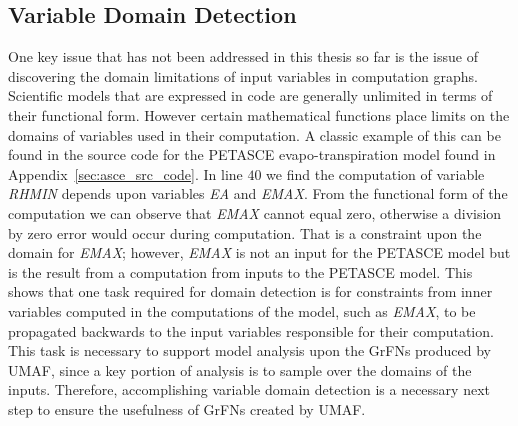 \subsection{Variable Domain Detection\label{sec:var_domain_detection}}
One key issue that has not been addressed in this thesis so far is the issue of discovering the domain limitations of input variables in computation graphs.
Scientific models that are expressed in code are generally unlimited in terms of their functional form.
However certain mathematical functions place limits on the domains of variables used in their computation.
A classic example of this can be found in the source code for the PETASCE evapo-transpiration model found in Appendix~\ref{sec:asce_src_code}.
In line $40$ we find the computation of variable \textit{RHMIN} depends upon variables \textit{EA} and \textit{EMAX}.
From the functional form of the computation we can observe that \textit{EMAX} cannot equal zero, otherwise a division by zero error would occur during computation.
That is a constraint upon the domain for \textit{EMAX}; however, \textit{EMAX} is not an input for the PETASCE model but is the result from a computation from inputs to the PETASCE model.
This shows that one task required for domain detection is for constraints from inner variables computed in the computations of the model, such as \textit{EMAX}, to be propagated backwards to the input variables responsible for their computation.
This task is necessary to support model analysis upon the GrFNs produced by UMAF, since a key portion of analysis is to sample over the domains of the inputs.
Therefore, accomplishing variable domain detection is a necessary next step to ensure the usefulness of GrFNs created by UMAF.
